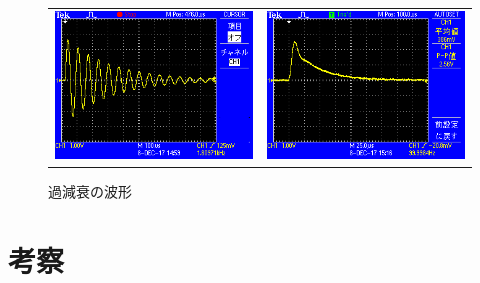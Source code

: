 \documentclass{jsarticle}
\begin{document}
\begin{figure}[H]
    \begin{tabular}{cc}
      \begin{minipage}[t]{0.45\hsize}
        \centering
        \includegraphics[keepaspectratio, scale=0.7]{F0002TEK.BMP}
        \caption{減衰振動の波形}
        \label{ラベル1}
      \end{minipage} &
      \begin{minipage}[t]{0.45\hsize}
        \centering
        \includegraphics[keepaspectratio, scale=0.7]{F0003TEK.BMP}
        \caption{過減衰の波形}
        \label{ラベル2}
      \end{minipage}
    \end{tabular}
  \end{figure}

    
    
\section{考察}
    
\end{document}
